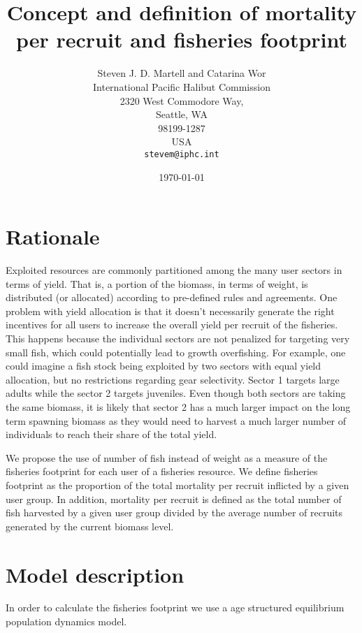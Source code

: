 \documentclass[12pt,letterpaper]{article}
\title{Concept and definition of mortality per recruit and fisheries footprint}
\author{Steven J. D. Martell and Catarina Wor\\
International Pacific Halibut Commission\\
2320 West Commodore Way,\\
Seattle, WA\\
98199-1287\\
USA\\
\texttt{stevem@iphc.int}
}
\date{\today}
\begin{document}
\section{Rationale}

Exploited resources are commonly partitioned among the many user sectors in terms of yield. That is, a portion of the biomass, in terms of weight, is distributed (or allocated) according to pre-defined rules and agreements. One problem with yield allocation is that it doesn't necessarily generate the right incentives for all users to increase the overall yield per recruit of the fisheries. This happens because the individual sectors are not penalized for targeting very small fish, which could potentially lead to growth overfishing. For example, one could imagine a fish stock being exploited by two sectors with equal yield allocation, but no restrictions regarding gear selectivity. Sector 1 targets large adults while the sector 2 targets juveniles. Even though both sectors are taking the same biomass, it is likely that sector 2 has a much larger impact on the long term spawning biomass as they would need to harvest a much larger number of individuals to reach their share of the total yield. 

 We propose the use of number of fish instead of weight as a measure of the fisheries footprint for each user of a fisheries resource.  We define fisheries footprint as the proportion of the total mortality per recruit inflicted by a given user group. In addition, mortality per recruit is defined as the total number of fish harvested by a given user group divided by the average number of recruits generated by the current biomass level.  


\section{Model description}

In order to calculate the fisheries footprint we use a age structured equilibrium population dynamics model. 


\end{document}
